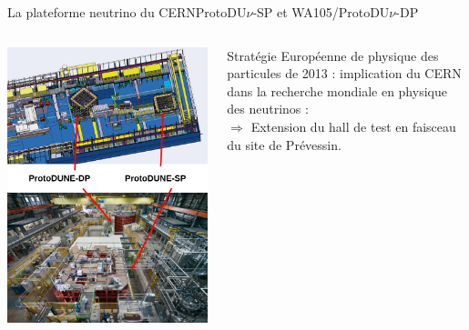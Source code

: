     \begin{frame}{La plateforme neutrino du CERN}{ProtoDU$\nu$-SP et WA105/ProtoDU$\nu$-DP}
        \begin{columns}
            \begin{column}{0.5\textwidth}
                \includegraphics[height=0.9\textheight]{./pictures/neutrino_platform.png}
            \end{column}
            \begin{column}{0.5\textwidth}
                \begin{scriptsize}
                    Stratégie Européenne de physique des particules de 2013 : implication du CERN dans la recherche mondiale en physique des neutrinos : \\ $\Rightarrow$ Extension du hall de test en faisceau du site de Prévessin.\vspace{0.4cm}
                    \begin{itemize}

\end{itemize}
\end{scriptsize}
\end{column}
\end{columns}
\end{frame}
